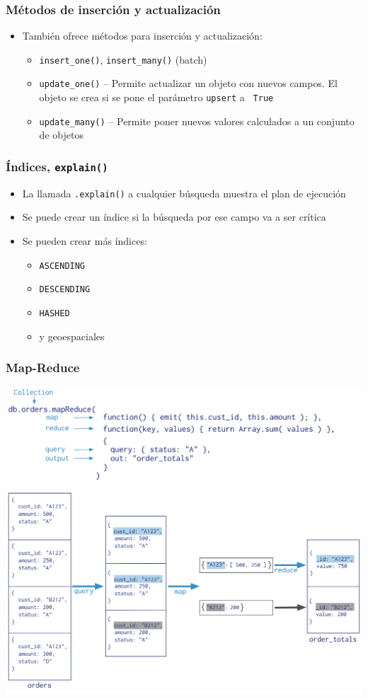 \documentclass[14pt]{beamer}
\begin{document}
\begin{frame}
  \frametitle{Métodos de inserción y actualización}
  \begin{itemize}
  \item También ofrece métodos para inserción y actualización:
    \begin{itemize}
    \item {\tt insert\_one()}, {\tt insert\_many()} (batch)
    \item {\tt update\_one()} -- Permite actualizar un objeto con nuevos
      campos. El objeto se crea si se pone el parámetro {\tt upsert} a {\tt
        True}
    \item {\tt update\_many()} -- Permite poner nuevos valores calculados a
      un conjunto de objetos
    \end{itemize}
  \end{itemize}
\end{frame}

\begin{frame}
  \frametitle{Índices, {\tt explain()}}
  \begin{itemize}
  \item La llamada {\tt .explain()} a cualquier búsqueda muestra el plan
    de ejecución
\item Se puede crear un índice si la búsqueda por ese campo va a ser
  crítica
\item Se pueden crear más índices:
  \begin{itemize}
  \item {\tt ASCENDING}
  \item {\tt DESCENDING}
  \item {\tt HASHED}
  \item y geoespaciales
  \end{itemize}
  \end{itemize}
\end{frame}

\begin{frame}
  \frametitle{Map-Reduce}
  \centering\includegraphics[height=.85\textheight]{img/mongo-map-reduce}
\end{frame}
\end{document}
